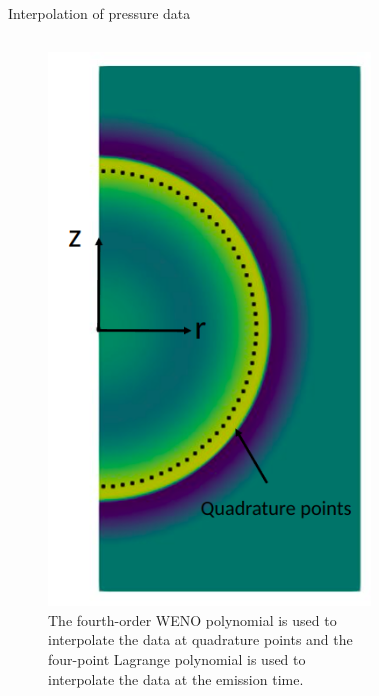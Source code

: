 \documentclass[10pt, aspectratio=169]{beamer}
\begin{document}
\begin{frame}{Interpolation of pressure data}
	\begin{columns}
		\begin{figure}
			\centering
			\includegraphics[scale=0.21]{images/arc.png}
			\caption{The fourth-order WENO polynomial is used to interpolate the data at quadrature points and the four-point Lagrange polynomial is used to interpolate the data at the emission time.}
		\end{figure}
		\begin{figure}
			\centering

\end{figure}
\end{columns}
\end{frame}
\end{document}
